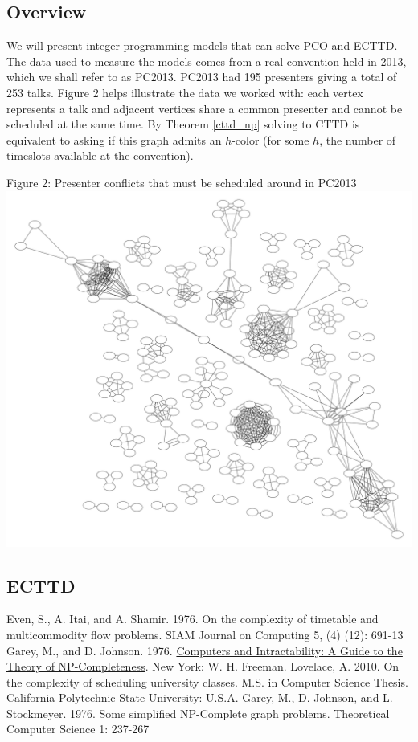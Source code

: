 \documentclass[]{article}
\theoremstyle{definition}
\theoremstyle{remark}
\numberwithin{equation}{section}
\begin{document}
\subsection{Overview}
We will present integer programming models that can solve PCO and ECTTD. The data used to measure the models comes from a real convention held in 2013, which we shall refer to as PC2013. PC2013 had 195 presenters giving a total of 253 talks. Figure 2 helps illustrate the data we worked with: each vertex represents a talk and adjacent vertices share a common presenter and cannot be scheduled at the same time. By Theorem \ref{cttd_np} solving to CTTD is equivalent to asking if this graph admits an $h$-color (for some $h$, the number of timeslots available at the convention).
\begin{center}
Figure 2: Presenter conflicts that must be scheduled around in PC2013 \\
\includegraphics[scale=0.2]{penguiconconflict}
\end{center}

\subsection{ECTTD}
\begin{center}

\end{center}


\begin{thebibliography}{9}
  Even, S., A. Itai, and A. Shamir. 1976. On the complexity of timetable and multicommodity flow problems. SIAM Journal on Computing 5, (4) (12): 691-13
  Garey, M., and D. Johnson. 1976. \underline{Computers and Intractability: A Guide to the Theory of NP-Completeness}. New York: W. H. Freeman.
  Lovelace, A. 2010. On the complexity of scheduling university classes. M.S. in Computer Science Thesis. California Polytechnic State University: U.S.A.	
  Garey, M., D. Johnson, and L. Stockmeyer. 1976. Some simplified NP-Complete graph problems. Theoretical Computer Science 1: 237-267
\end{thebibliography}
\end{document}
